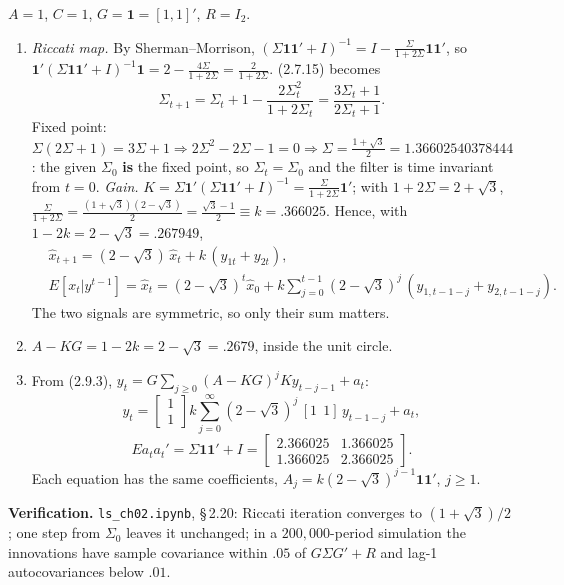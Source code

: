 \documentclass[12pt, letterpaper]{article}
\newcommand{\nb}[1]{\texttt{ls\_ch02.ipynb}, \S\,#1}
\begin{document}
\begin{tcolorbox}[evenbox,title={Exercise 2.20 \quad Random Walk Seen Through Two Signals}]
$A=1$, $C=1$, $G=\mathbf 1=[1,1]'$, $R=I_2$.
\begin{enumerate}
\item \emph{Riccati map.} By Sherman--Morrison, $(\Sigma\mathbf 1\mathbf 1'+I)^{-1}=I-\frac{\Sigma}{1+2\Sigma}\mathbf 1\mathbf 1'$,
so $\mathbf 1'(\Sigma\mathbf 1\mathbf 1'+I)^{-1}\mathbf 1=2-\frac{4\Sigma}{1+2\Sigma}=\frac{2}{1+2\Sigma}$.
(2.7.15) becomes
\[
\Sigma_{t+1}=\Sigma_t+1-\frac{2\Sigma_t^2}{1+2\Sigma_t}=\frac{3\Sigma_t+1}{2\Sigma_t+1}.
\]
Fixed point: $\Sigma(2\Sigma+1)=3\Sigma+1\Rightarrow2\Sigma^2-2\Sigma-1=0\Rightarrow
\Sigma=\frac{1+\sqrt3}{2}=1.36602540378444$: the given $\Sigma_0$ \textbf{is} the fixed point, so
$\Sigma_t=\Sigma_0$ and the filter is time invariant from $t=0$.
\emph{Gain.} $K=\Sigma\mathbf 1'(\Sigma\mathbf 1\mathbf 1'+I)^{-1}=\frac{\Sigma}{1+2\Sigma}\mathbf 1'$; with
$1+2\Sigma=2+\sqrt3$, $\frac{\Sigma}{1+2\Sigma}=\frac{(1+\sqrt3)(2-\sqrt3)}{2}=\frac{\sqrt3-1}{2}\equiv k=.366025$.
Hence, with $1-2k=2-\sqrt3=.267949$,
\[
\begin{aligned}
&\boxed{\hat x_{t+1}=(2-\sqrt3)\,\hat x_t+k\,(y_{1t}+y_{2t})},\\
&E[x_t|y^{t-1}]=\hat x_t=(2-\sqrt3)^t\hat x_0+k\sum_{j=0}^{t-1}(2-\sqrt3)^j\,(y_{1,t-1-j}+y_{2,t-1-j}).
\end{aligned}
\]
The two signals are symmetric, so only their sum matters.
\item $A-KG=1-2k=2-\sqrt3=.2679$, inside the unit circle. \checkmark
\item From (2.9.3), $y_t=G\sum_{j\ge0}(A-KG)^jKy_{t-j-1}+a_t$:
\[
\boxed{y_t=\begin{bmatrix}1\\1\end{bmatrix}k\sum_{j=0}^\infty(2-\sqrt3)^j\,[1\ \ 1]\,y_{t-1-j}+a_t},
\]
\[
Ea_ta_t'=\Sigma\mathbf 1\mathbf 1'+I=\begin{bmatrix}2.366025&1.366025\\1.366025&2.366025\end{bmatrix}.
\]
Each equation has the same coefficients, $A_j=k(2-\sqrt3)^{j-1}\mathbf 1\mathbf 1'$, $j\ge1$.
\end{enumerate}

\textbf{Verification.} \nb{2.20}: Riccati iteration converges to $(1+\sqrt3)/2$; one step from
$\Sigma_0$ leaves it unchanged; in a $200{,}000$-period simulation the innovations have sample
covariance within $.05$ of $G\Sigma G'+R$ and lag-1 autocovariances below $.01$. \checkmark
\end{tcolorbox}
\end{document}
